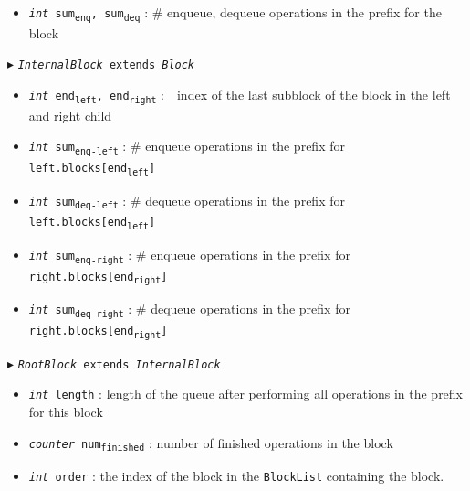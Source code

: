 \documentclass[10pt]{article}
\newcommand{\sub}[1]{\textsubscript{#1}}
\renewcommand{\tt}[1]{\texttt{#1}}
\renewcommand{\sl}[1]{\textsl{#1}}
\theoremstyle{definition}
\begin{document}
\begin{algorithm}
\begin{algorithmic}[1]
\begin{multicols}{2}
\begin{itemize}
    \item \tt{\sl{int} sum\sub{enq}, sum\sub{deq}}
  \textsf{: \# enqueue, dequeue operations in the prefix for the block}
  
\end{itemize}

\Statex $\blacktriangleright$ \tt{\sl{InternalBlock} extends \sl{Block}}
\begin{itemize}
    \item \tt{\sl{int} end\sub{left}, end\sub{right}}
  \textsf{:~~index of the last subblock of the block in the left and right child}
  \item \tt{\sl{int} sum\sub{enq-left}}
  \textsf{: \# enqueue operations in the prefix for \tt{left.blocks[end\sub{left}]}}
  \item \tt{\sl{int} sum\sub{deq-left}}
  \textsf{: \# dequeue operations in the prefix for \tt{left.blocks[end\sub{left}]}}
  \item \tt{\sl{int} sum\sub{enq-right}}
  \textsf{: \# enqueue operations in the prefix for \tt{right.blocks[end\sub{right}]}}
  \item \tt{\sl{int} sum\sub{deq-right}}
  \textsf{: \# dequeue operations in the prefix for \tt{right.blocks[end\sub{right}]}}
\end{itemize}


\Statex $\blacktriangleright$ \tt{\sl{RootBlock} extends \sl{InternalBlock}}
\begin{itemize}
  \item \tt{\sl{int} length}
  \textsf{: length of the queue after performing all operations in the prefix for this block}
  \item \tt{\sl{counter} num\sub{finished}}
  \textsf{: number of finished operations in the block}
    \item \tt{\sl{int} order}
  \textsf{: the index of the block in the \tt{BlockList} containing the block.}
\end{itemize}



\end{multicols}
\end{algorithmic}
\end{algorithm}
\end{document}

